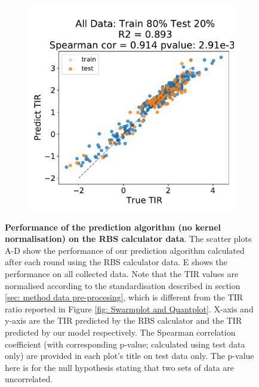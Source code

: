 \documentclass{scrartcl}[2013/05/29]%
\begin{document}
\begin{figure}[!ht]
\begin{subfigure}[b]{0.49\textwidth}
    \end{subfigure}
    \begin{subfigure}[b]{0.49\textwidth}
        \centering
        \caption{}
        \includegraphics[scale=0.4]{plots/Supplementary/salis_scatter_abc1_FF_4.pdf}
    \end{subfigure}
    \caption{\textbf{Performance of the prediction algorithm (no kernel normalisation) on the RBS calculator data}. The scatter plots A-D show the performance of our prediction algorithm calculated after each round using the RBS calculator data.
    E shows the performance on all collected data.
    Note that the TIR values are normalised according to the standardisation described in section \ref{sec: method data pre-procesing}, which is different from the TIR ratio reported in Figure \ref{fig: Swarmplot and Quantplot}.
    X-axis and y-axis are the TIR predicted by the RBS calculator and the TIR predicted by our model respectively.
    The Spearman correlation coefficient (with corresponding p-value; calculated using test data only) are provided in each plot's title on test data only.
    The p-value here is for the null hypothesis stating that two sets of data are uncorrelated.
    }
    \label{fig: Scatterplot_Salis}
\end{figure}
\end{document}
